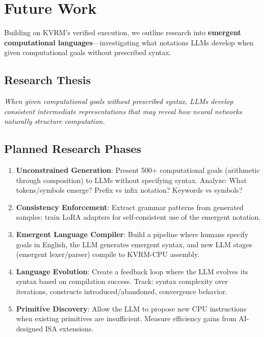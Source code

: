 \documentclass[11pt,a4paper]{article}
\begin{document}
\section{Future Work}
\label{sec:future}

Building on KVRM's verified execution, we outline research into \textbf{emergent computational languages}---investigating what notations LLMs develop when given computational goals without prescribed syntax.

\subsection{Research Thesis}

\textit{When given computational goals without prescribed syntax, LLMs develop consistent intermediate representations that may reveal how neural networks naturally structure computation.}

\subsection{Planned Research Phases}

\begin{enumerate}
    \item \textbf{Unconstrained Generation}: Present 500+ computational goals (arithmetic through composition) to LLMs without specifying syntax. Analyze: What tokens/symbols emerge? Prefix vs infix notation? Keywords vs symbols?

    \item \textbf{Consistency Enforcement}: Extract grammar patterns from generated samples; train LoRA adapters for self-consistent use of the emergent notation.

    \item \textbf{Emergent Language Compiler}: Build a pipeline where humans specify goals in English, the LLM generates emergent syntax, and new LLM stages (emergent lexer/parser) compile to KVRM-CPU assembly.

    \item \textbf{Language Evolution}: Create a feedback loop where the LLM evolves its syntax based on compilation success. Track: syntax complexity over iterations, constructs introduced/abandoned, convergence behavior.

    \item \textbf{Primitive Discovery}: Allow the LLM to propose new CPU instructions when existing primitives are insufficient. Measure efficiency gains from AI-designed ISA extensions.
\end{enumerate}
\end{document}
